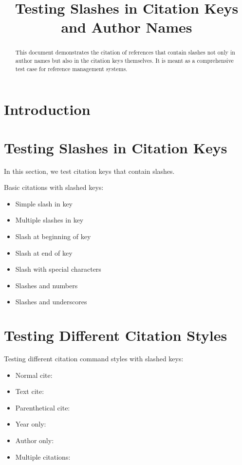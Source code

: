 \documentclass[conference,a4paper,english]{IEEEtran}[2015/08/26]
\begin{document}
\title{Testing Slashes in Citation Keys and Author Names}
\author{%
}

\maketitle

\begin{abstract}
This document demonstrates the citation of references that contain slashes not only in author names but also in the citation keys themselves. It is meant as a comprehensive test case for reference management systems.
\end{abstract}

\section{Introduction}
\lipsum[2]

\section{Testing Slashes in Citation Keys}
In this section, we test citation keys that contain slashes.

Basic citations with slashed keys:
\begin{itemize}
  \item Simple slash in key \cite{pgf/tikz}
  \item Multiple slashes in key \cite{html/css/js}
  \item Slash at beginning of key \cite{/leading}
  \item Slash at end of key \cite{trailing/}
  \item Slash with special characters \cite{test@/example}
  \item Slashes and numbers \cite{doi/10.1000/xyz123}
  \item Slashes and underscores \cite{acm/ieee_joint}
\end{itemize}

\section{Testing Different Citation Styles}
Testing different citation command styles with slashed keys:
\begin{itemize}
  \item Normal cite: \cite{pgf/tikz}
  \item Text cite: \citet{r/qtl}
  \item Parenthetical cite: \citep{java/jakarta}
  \item Year only: \citeyear{gnu/linux}
  \item Author only: \citeauthor{ios/android}
  \item Multiple citations: \cite{pgf/tikz,r/qtl,java/jakarta}
\end{itemize}
\end{document}
